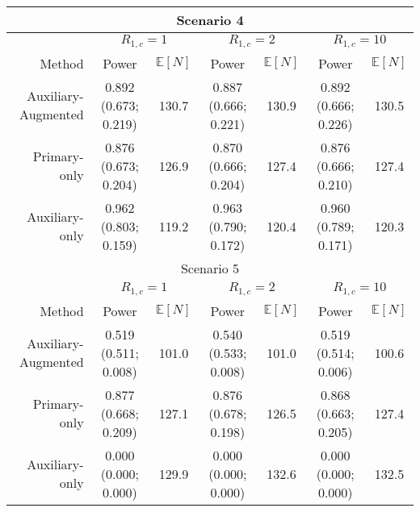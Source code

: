 \begin{tabular}{r|cc|cc|cc}
\bottomrule 
\multicolumn{7}{c}{Scenario 4}\\ 
\midrule 
& \multicolumn{2}{c}{$R_{1,c}= 1$} & \multicolumn{2}{c}{$R_{1,c} = 2$} & \multicolumn{2}{c}{$R_{1,c} = 10$} \\ 
Method &  Power &   $\mathbb E[N]$ &
               Power &   $\mathbb E[N]$ &
               Power &   $\mathbb E[N]$  \\ 
Auxiliary-Augmented &0.892  (0.673; 0.219) & 130.7 &0.887  (0.666; 0.221) & 130.9 &0.892  (0.666; 0.226) & 130.5 \\ 
Primary-only &0.876  (0.673; 0.204) & 126.9 &0.870  (0.666; 0.204) & 127.4 &0.876  (0.666; 0.210) & 127.4 \\ 
Auxiliary-only &0.962  (0.803; 0.159) & 119.2 &0.963  (0.790; 0.172) & 120.4 &0.960  (0.789; 0.171) & 120.3 \\ 
\bottomrule 
\multicolumn{7}{c}{Scenario 5}\\ 
\midrule 
& \multicolumn{2}{c}{$R_{1,c}= 1$} & \multicolumn{2}{c}{$R_{1,c} = 2$} & \multicolumn{2}{c}{$R_{1,c} = 10$} \\ 
Method &  Power &   $\mathbb E[N]$ &
               Power &   $\mathbb E[N]$ &
               Power &   $\mathbb E[N]$  \\ 
Auxiliary-Augmented &0.519  (0.511; 0.008) & 101.0 &0.540  (0.533; 0.008) & 101.0 &0.519  (0.514; 0.006) & 100.6 \\ 
Primary-only &0.877  (0.668; 0.209) & 127.1 &0.876  (0.678; 0.198) & 126.5 &0.868  (0.663; 0.205) & 127.4 \\ 
Auxiliary-only &0.000  (0.000; 0.000) & 129.9 &0.000  (0.000; 0.000) & 132.6 &0.000  (0.000; 0.000) & 132.5 \\ 
\bottomrule 
\end{tabular} 
